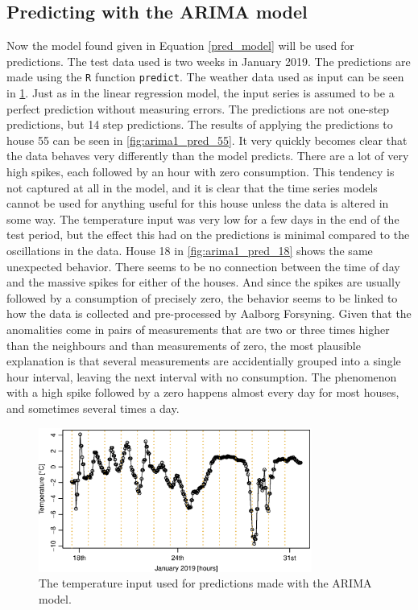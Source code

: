 \subsection{Predicting with the ARIMA model}
Now the model found given in Equation \ref{pred_model} will be used for predictions. The test data used is two weeks in January 2019. The predictions are made using the \texttt{R} function \texttt{predict}. The  weather data used as input can be seen in \cref{fig:weather_pred_hour}. Just as in the linear regression model, the input series is assumed to be a perfect prediction without measuring errors. The predictions are not one-step predictions, but 14 step predictions. The results of applying the predictions to house 55 can be seen in \cref{fig:arima1_pred_55}. It very quickly becomes clear that the data behaves very differently than the model predicts. There are a lot of very high spikes, each followed by an hour with zero consumption. This tendency is not captured at all in the model, and it is clear that the time series models cannot be used for anything useful for this house unless the data is altered in some way. The temperature input was very low for a few days in the end of the test period, but the effect this had on the predictions is minimal compared to the oscillations in the data. House 18 in \cref{fig:arima1_pred_18} shows the same unexpected behavior. There seems to be no connection between the time of day and the massive spikes for either of the houses. And since the spikes are usually followed by a consumption of precisely zero, the behavior seems to be linked to how the data is collected and pre-processed by Aalborg Forsyning. Given that the anomalities come in pairs of measurements that are two or three times higher than the neighbours and than measurements of zero, the most plausible explanation is that several measurements are accidentially grouped into a single hour interval, leaving the next interval with no consumption. The phenomenon with a high spike followed by a zero happens almost every day for most houses, and sometimes several times a day.
\begin{figure}[!htb]
    \centering
    \includegraphics[width=0.8\textwidth]{../../../figures/TestWeatherHour.eps}
    \caption{The temperature input used for predictions made with the ARIMA model.}
    \label{fig:weather_pred_hour}
\end{figure}
